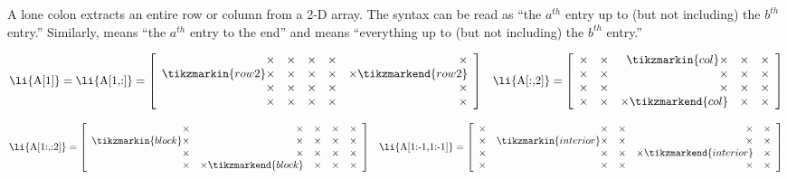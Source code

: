 A lone colon extracts an entire row or column from a 2-D array.
The syntax \li{[a:b]} can be read as ``the $a^{th}$ entry up to (but not including) the $b^{th}$ entry.''
Similarly, \li{[a:]} means ``the $a^{th}$ entry to the end'' and \li{[:b]} means ``everything up to (but not including) the $b^{th}$ entry.''

\begin{align*}
\text{\li{A[1]}} = \text{\li{A[1,:]}} = \left[\begin{array}{rrrrr}
\times & \times & \times & \times & \times\\
\tikzmarkin{row2}\times & \times & \times & \times & \times\tikzmarkend{row2}\\
\times & \times & \times & \times & \times\\
\times & \times & \times & \times & \times\\
\end{array}\right]
&&
\text{\li{A[:,2]}} = \left[\begin{array}{rrrrr}
\times & \times & \tikzmarkin{col}\times & \times & \times\\
\times & \times & \times & \times & \times\\
\times & \times & \times & \times & \times\\
\times & \times & \times\tikzmarkend{col} & \times & \times
\end{array}\right]
\end{align*}

\begin{align*}
\text{\li{A[1:,:2]}} = \left[\begin{array}{rrrrr}
\times & \times & \times & \times & \times\\
\tikzmarkin{block}\times & \times & \times & \times & \times\\
\times & \times & \times & \times & \times\\
\times & \times\tikzmarkend{block} & \times & \times & \times
\end{array}\right]
&&
\text{\li{A[1:-1,1:-1]}} = \left[\begin{array}{rrrrr}
\times & \times & \times & \times & \times\\
\times & \tikzmarkin{interior} \times & \times & \times & \times\\
\times & \times & \times & \times \tikzmarkend{interior} & \times\\
\times & \times & \times & \times & \times\end{array}\right]
\end{align*}

